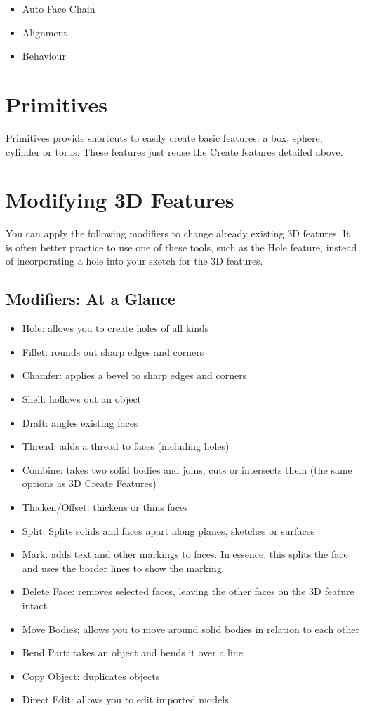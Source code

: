 \begin{itemize}
\item Auto Face Chain
\item Alignment
\item Behaviour
\end{itemize}

\section{Primitives}
Primitives provide shortcuts to easily create basic features: a box, sphere, cylinder or torus. These features just reuse the Create features detailed above.

\section{Modifying 3D Features}

You can apply the following modifiers to change already existing 3D features. It is often better practice to use one of these tools, such as the Hole feature, instead of incorporating a hole into your sketch for the 3D features.

\subsection{Modifiers: At a Glance}

\begin{itemize}
\item Hole: allows you to create holes of all kinds
\item Fillet: rounds out sharp edges and corners
\item Chamfer: applies a bevel to sharp edges and corners
\item Shell: hollows out an object
\item Draft: angles existing faces
\item Thread: adds a thread to faces (including holes)
\item Combine: takes two solid bodies and joins, cuts or intersects them (the same options as 3D Create Features)
\item Thicken/Offset: thickens or thins faces 
\item Split: Splits solids and faces apart along planes, sketches or surfaces
\item Mark: adds text and other markings to faces. In essence, this splits the face and uses the border lines to show the marking
\item Delete Face: removes selected faces, leaving the other faces on the 3D feature intact
\item Move Bodies: allows you to move around solid bodies in relation to each other
\item Bend Part: takes an object and bends it over a line
\item Copy Object: duplicates objects
\item Direct Edit: allows you to edit imported models
\end{itemize}

